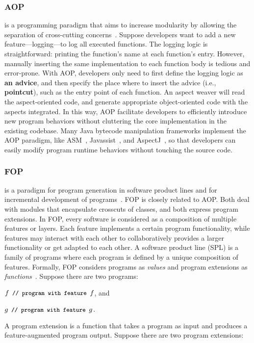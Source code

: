 \documentclass[runningheads,a4paper]{llncs}
\newcommand{\text}[1]{\footnotesize{\texttt{#1}}\normalsize}
\begin{document}
\subsubsection{AOP} is a programming paradigm that aims to increase modularity by allowing the separation of cross-cutting concerns~\cite{Kiczales1997}. Suppose developers want to add a new feature---logging---to log all executed functions. 
The logging logic is straightforward: printing the function's name at each function's entry. However, manually inserting the same implementation to each function body is tedious and error-prone. With AOP, developers only need to first define the logging logic as \textbf{an advice}, and then specify the place where to insert the advice (i.e., \textbf{pointcut}), such as the entry point of each function. An aspect weaver will read the aspect-oriented code, and generate appropriate object-oriented code with the aspects integrated. In this way, AOP facilitate developers to efficiently introduce new program behaviors without cluttering the core implementation in the existing codebase. Many Java bytecode manipulation frameworks implement the AOP paradigm, like ASM~\cite{asm}, Javassist~\cite{javassist}, and AspectJ~\cite{aspectj}, so that developers can easily modify program runtime behaviors without touching the source code. 


\subsubsection{FOP} is a paradigm for program generation in software product lines and for incremental development of programs~\cite{Batory1992:DIH}. 
FOP is closely related to AOP. Both deal with modules that encapsulate crosscuts of classes, and both express program extensions.
In FOP, every software is considered as a composition of multiple features or layers. Each feature implements a certain program functionality, while features may interact with each other to collaboratively provides a larger functionality or get adapted to each other.
A software product line (SPL) is a family of programs where each program is defined by a unique composition of features. Formally, FOP considers programs as \emph{values} and program extensions as \emph{functions}~\cite{Lammel2013:fop}. Suppose there are two programs: 

$f \text{	// program with feature }f$, and

$g\text{	// program with feature }g$.

\noindent
A program extension is a function that takes a program as input and produces a feature-augmented program output. Suppose there are two program extensions:
\end{document}
